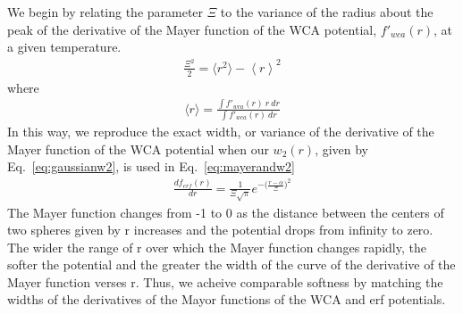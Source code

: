 \documentclass[letterpaper,twocolumn,amsmath,amssymb,prb]{revtex4-1}
\newcommand\davidsays[1]{{\bf \color{blue}D: #1}}
\begin{document}


We begin by relating the parameter $\Xi$ to the variance of the radius 
about the peak of the derivative of the Mayer function 
of the WCA potential, $f'_{wca}(r)$,
at a given temperature.
\begin{align}
    \frac{\Xi^2}{2}= \langle r^2\rangle-\left<r\right>^2
\end{align}
where
\begin{align}
    \langle r\rangle = \frac{\int f'_{wca}(r)~r~dr}{\int f'_{wca}(r)~dr}
\end{align}
In this way, we reproduce the exact width, or variance of the derivative 
of the Mayer function of the WCA potential when our $w_2(r)$, given by 
Eq.~\ref{eq:gaussianw2}, is used in     
Eq.~\ref{eq:mayerandw2} 
\begin{align}
   \frac{df_{erf}(r)}{dr}=\frac{1}{\Xi\sqrt{\pi}}e^{-\big(\frac{r-\alpha}{\Xi}\big)^2}
\end{align}
The Mayer function changes from -1 to 0 as the distance between the centers
of two spheres given by r increases and the potential drops from infinity to zero. 
The wider the range of r over which the Mayer function changes rapidly, 
the softer the potential and the greater the width of the curve of the 
derivative of the Mayer function verses r. Thus, we acheive comparable 
softness by matching the widths of the derivatives of the 
Mayor functions of the WCA and erf potentials. 
\end{document}
